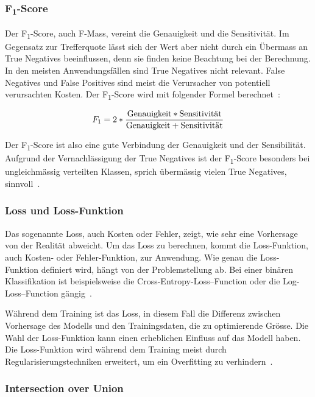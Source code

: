 \subsubsection{F\textsubscript{1}-Score}
\label{chap:f1-score}

Der F\textsubscript{1}-Score, auch F-Mass, vereint die Genauigkeit und die Sensitivität. Im Gegensatz zur Trefferquote lässt sich der Wert aber nicht durch ein Übermass an True Negatives beeinflussen, denn sie finden keine Beachtung bei der Berechnung. In den meisten Anwendungsfällen sind True Negatives nicht relevant. False Negatives und False Positives sind meist die Verursacher von potentiell verursachten Kosten. Der F\textsubscript{1}-Score wird mit folgender Formel berechnet~\autocite{TDSAccuracy}:

$$F_1=2 * \frac{\textnormal{Genauigkeit} * \textnormal{Sensitivität}}{\textnormal{Genauigkeit} + \textnormal{Sensitivität}}$$

Der F\textsubscript{1}-Score ist also eine gute Verbindung der Genauigkeit und der Sensibilität. Aufgrund der Vernachlässigung der True Negatives ist der F\textsubscript{1}-Score besonders bei ungleichmässig verteilten Klassen, sprich übermässig vielen True Negatives, sinnvoll~\autocite{TDSAccuracy}.

\subsubsection{Loss und Loss-Funktion}

Das sogenannte Loss, auch Kosten oder Fehler, zeigt, wie sehr eine Vorhersage von der Realität abweicht. Um das Loss zu berechnen, kommt die Loss-Funktion, auch Kosten- oder Fehler-Funktion, zur Anwendung. Wie genau die Loss-Funktion definiert wird, hängt von der Problemstellung ab. Bei einer binären Klassifikation ist beispielsweise die Cross-Entropy-Loss–Function oder die Log-Loss–Function gängig~\autocite{TDSLoss}. 

Während dem Training ist das Loss, in diesem Fall die Differenz zwischen Vorhersage des Modells und den Trainingsdaten, die zu optimierende Grösse. Die Wahl der Loss-Funktion kann einen erheblichen Einfluss auf das Modell haben. Die Loss-Funktion wird während dem Training meist durch Regularisierungstechniken erweitert, um ein Overfitting zu verhindern~\autocite{Goodfellow2016}.

\subsubsection{Intersection over Union}

